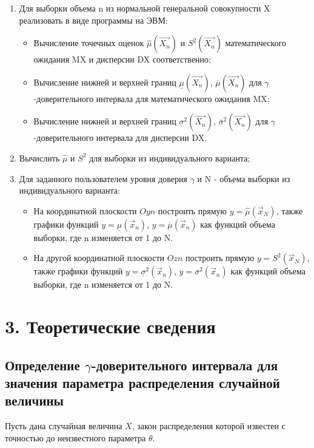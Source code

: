 \documentclass[12pt,a4paper]{scrreprt}
\begin{document}
\begin{enumerate}
	\item Для выборки объема n из нормальной генеральной совокупности X реализовать в виде программы на ЭВМ:
	\begin{itemize}
		\item Вычисление точечных оценок $\hat\mu(\vec{X_n})$ и $S^2(\vec{X_n}) $ математического ожидания MX и дисперсии DX соответственно;
		\item Вычисление нижней и верхней границ $\underline{\mu}(\vec{X_n})$, $\overline{\mu}(\vec{X_n})$ для $\gamma$-доверительного интервала для математического ожидания MX;
		\item Вычисление нижней и верхней границ $\underline{\sigma}^2(\vec{X_n})$, $\overline{\sigma}^2(\vec{X_n})$ для $\gamma$-доверительного интервала для дисперсии DX.
	\end{itemize}
	\item Вычислить $\hat\mu$ и $S^2$ для выборки из индивидуального варианта;
	\item Для заданного пользователем уровня доверия $\gamma$ и N - объема выборки из индивидуального варианта:
	\begin{itemize}
		\item На координатной плоскости $Oyn$ построить прямую $y = \hat\mu(\vec{x}_N)$, также графики функций $y = \underline{\mu}(\vec{x}_n)$, $y = \overline{\mu}(\vec{x}_n)$ как функций объема выборки, где n изменяется от 1 до N.
		\item На другой координатной плоскости $Ozn$ построить прямую $y = S^2(\vec{x}_N)$, также графики функций $y = \underline{\sigma}^2(\vec{x}_n)$, $y = \overline{\sigma}^2(\vec{x}_n)$ как функций объема выборки, где n изменяется от 1 до N.
	\end{itemize}
\end{enumerate}

\section*{3. Теоретические сведения}

\subsection*{Определение $\gamma$-доверительного интервала для значения параметра распределения случайной величины}

Пусть дана случайная величина $X$, закон распределения которой известен с точностью до неизвестного параметра $\theta$.
\end{document}
